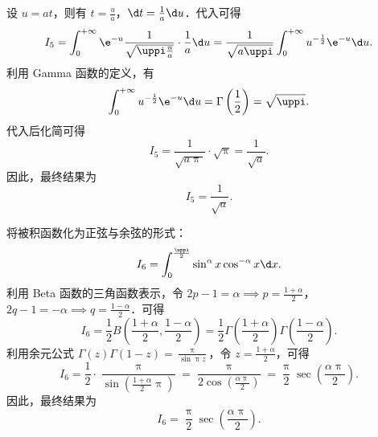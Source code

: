 \begin{solution}
    设 $u = at$，则有 $t = \frac{u}{a}$，$\d t = \frac{1}{a} \d u$．代入可得
    \begin{equation}\label{eq:sol5-1}
        I_5 = \int_{0}^{+\infty} \e^{-u} \frac{1}{\sqrt{\uppi \frac{u}{a}}} \cdot \frac{1}{a} \d u = \frac{1}{\sqrt{a\uppi}} \int_{0}^{+\infty} u^{-\frac{1}{2}} \e^{-u} \d u.
    \end{equation}
    利用 Gamma 函数的定义，有
    \begin{equation}\label{eq:sol5-2}
        \int_{0}^{+\infty} u^{-\frac{1}{2}} \e^{-u} \d u = \Gamma\left(\frac{1}{2}\right) = \sqrt{\uppi}.
    \end{equation}
    代入后化简可得
    \begin{equation}\label{eq:sol5-3}
        I_5 = \frac{1}{\sqrt{a\uppi}} \cdot \sqrt{\uppi} = \frac{1}{\sqrt{a}}.
    \end{equation}
    因此，最终结果为
    \begin{equation}
        I_5 = \boxed{\frac{1}{\sqrt{a}}}.
    \end{equation}


    将被积函数化为正弦与余弦的形式：
    \begin{equation}\label{eq:sol6-1}
        I_6 = \int_{0}^{\frac{\uppi}{2}} \sin^{\alpha} x \cos^{-\alpha} x \d x.
    \end{equation}
    利用 Beta 函数的三角函数表示，令 $2p-1 = \alpha \implies p = \frac{1+\alpha}{2}$，$2q-1 = -\alpha \implies q = \frac{1-\alpha}{2}$．可得
    \begin{equation}\label{eq:sol6-2}
        I_6 = \frac{1}{2} B\left(\frac{1+\alpha}{2}, \frac{1-\alpha}{2}\right) = \frac{1}{2} \Gamma\left(\frac{1+\alpha}{2}\right) \Gamma\left(\frac{1-\alpha}{2}\right).
    \end{equation}
    利用余元公式 $\Gamma(z) \Gamma(1-z) = \frac{\uppi}{\sin \uppi z}$，令 $z = \frac{1+\alpha}{2}$，可得
    \begin{equation}\label{eq:sol6-3}
        I_6 = \frac{1}{2} \cdot \frac{\uppi}{\sin\left(\frac{1+\alpha}{2}\uppi\right)} = \frac{\uppi}{2 \cos\left(\frac{\alpha\uppi}{2}\right)} = \frac{\uppi}{2} \sec\left(\frac{\alpha\uppi}{2}\right).
    \end{equation}
    因此，最终结果为
    \begin{equation}
        I_6 = \boxed{\frac{\uppi}{2} \sec\left(\frac{\alpha\uppi}{2}\right)}.
    \end{equation}



\end{solution}
